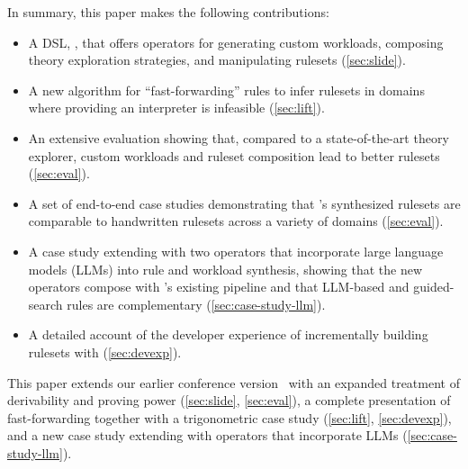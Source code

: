 In summary, this paper makes the following contributions:
\begin{itemize}
  \item A DSL, \enumo, that offers operators for
    generating custom workloads,
    composing theory exploration strategies,
    and manipulating rulesets (\autoref{sec:slide}).
  \item A new algorithm for ``fast-forwarding'' rules to
    infer rulesets in domains where providing
    an interpreter is infeasible (\autoref{sec:lift}).
  \item An extensive evaluation showing that,
      compared to a state-of-the-art theory explorer,
      custom workloads and ruleset composition lead
      to better rulesets (\autoref{sec:eval}).
  \item A set of end-to-end case studies demonstrating that
    \enumo's synthesized rulesets are comparable to handwritten rulesets
    across a variety of domains (\autoref{sec:eval}).
  \item A case study extending \enumo with two operators that
    incorporate large language models (LLMs) into rule and workload
    synthesis, showing that the new operators compose with \enumo's
    existing pipeline and that LLM-based and guided-search rules
    are complementary
    (\autoref{sec:case-study-llm}).
  \item A detailed account of the developer experience of
    incrementally building rulesets with \enumo (\autoref{sec:devexp}).
\end{itemize}

This paper extends our earlier conference
version~\citep{enumo-oopsla23} with an expanded treatment of
derivability and proving power (\autoref{sec:slide},
\autoref{sec:eval}), a complete presentation of fast-forwarding
together with a trigonometric case study (\autoref{sec:lift},
\autoref{sec:devexp}), and a new case study extending \enumo with
operators that incorporate LLMs (\autoref{sec:case-study-llm}).

